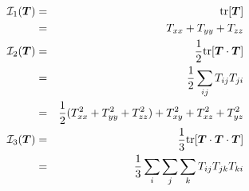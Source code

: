 \begin{eqnarray}
{\cal I}_1({\bm T}) 
&=& {\rm tr}[\bm{T}] \\
&=& T_{xx} + T_{yy} + T_{zz} \\ 
{\cal I}_2({\bm T}) 
&=& \frac{1}{2} {\rm tr}[{\bm T}\cdot{\bm T}] \\
&=& \frac{1}{2} \sum_{ij} T_{ij} T_{ji} \\
&=& \frac{1}{2} (T_{xx}^2 + T_{yy}^2 + T_{zz}^2) + T_{xy}^2 + T_{xz}^2 + T_{yz}^2 \\
{\cal I}_3({\bm T}) 
&=& \frac{1}{3} {\rm tr}[{\bm T}\cdot{\bm T}\cdot {\bm T}]   \\
&=& \frac{1}{3}\sum_i\sum_j \sum_k T_{ij} T_{jk} T_{ki}  
\end{eqnarray}


